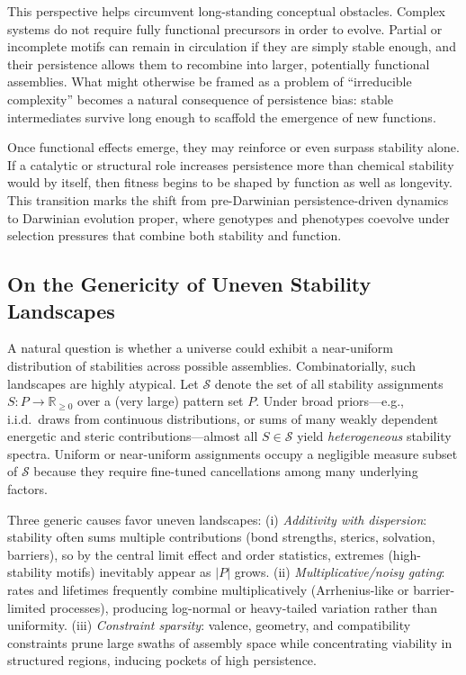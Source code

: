 \documentclass[life,article,submit,pdftex,moreauthors]{Definitions/mdpi}
\begin{document}
This perspective helps circumvent long-standing conceptual obstacles. Complex 
systems do not require fully functional precursors in order to evolve. Partial or 
incomplete motifs can remain in circulation if they are simply stable enough, and 
their persistence allows them to recombine into larger, potentially functional 
assemblies. What might otherwise be framed as a problem of ``irreducible complexity'' 
becomes a natural consequence of persistence bias: stable intermediates survive long 
enough to scaffold the emergence of new functions.  

Once functional effects emerge, they may reinforce or even surpass stability alone. 
If a catalytic or structural role increases persistence more than chemical stability 
would by itself, then fitness begins to be shaped by function as well as longevity. 
This transition marks the shift from pre-Darwinian persistence-driven dynamics to 
Darwinian evolution proper, where genotypes and phenotypes coevolve under 
selection pressures that combine both stability and function.


\subsection{On the Genericity of Uneven Stability Landscapes}

A natural question is whether a universe could exhibit a near-uniform distribution of
stabilities across possible assemblies. Combinatorially, such landscapes are highly
atypical. Let $\mathcal{S}$ denote the set of all stability assignments 
$S:P\!\to\!\mathbb{R}_{\ge 0}$ over a (very large) pattern set $P$. Under broad
priors—e.g., i.i.d.\ draws from continuous distributions, or sums of many weakly
dependent energetic and steric contributions—almost all $S\in\mathcal{S}$ yield
\emph{heterogeneous} stability spectra. Uniform or near-uniform assignments occupy a
negligible measure subset of $\mathcal{S}$ because they require fine-tuned cancellations
among many underlying factors.

Three generic causes favor uneven landscapes:
(i) \textit{Additivity with dispersion}: stability often sums multiple contributions
(bond strengths, sterics, solvation, barriers), so by the central limit effect and
order statistics, extremes (high-stability motifs) inevitably appear as $|P|$ grows.
(ii) \textit{Multiplicative/noisy gating}: rates and lifetimes frequently combine
multiplicatively (Arrhenius-like or barrier-limited processes), producing log-normal
or heavy-tailed variation rather than uniformity.
(iii) \textit{Constraint sparsity}: valence, geometry, and compatibility constraints
prune large swaths of assembly space while concentrating viability in structured
regions, inducing pockets of high persistence.
\end{document}

